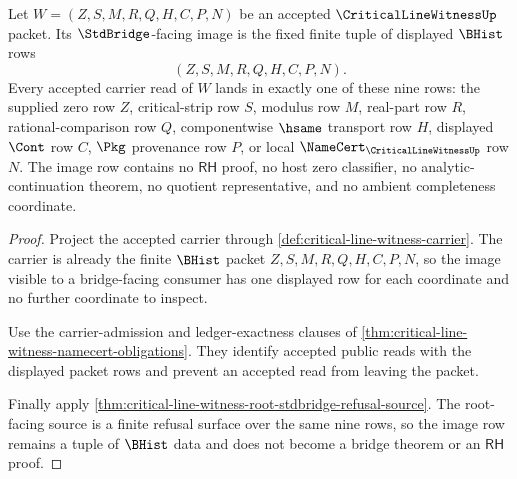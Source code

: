 \begin{theorem}
\label{thm:critical-line-witness-fixed-tuple-image-row}
Let $W=(Z,S,M,R,Q,H,C,P,N)$ be an accepted $\CriticalLineWitnessUp$ packet. Its $\StdBridge$-facing image is the fixed finite tuple of displayed $\BHist$ rows
$$
(Z,S,M,R,Q,H,C,P,N).
$$
Every accepted carrier read of $W$ lands in exactly one of these nine rows: the supplied zero row $Z$, critical-strip row $S$, modulus row $M$, real-part row $R$, rational-comparison row $Q$, componentwise $\hsame$ transport row $H$, displayed $\Cont$ row $C$, $\Pkg$ provenance row $P$, or local $\NameCert_{\CriticalLineWitnessUp}$ row $N$. The image row contains no $\mathsf{RH}$ proof, no host zero classifier, no analytic-continuation theorem, no quotient representative, and no ambient completeness coordinate.
\end{theorem}
\begin{proof}
Project the accepted carrier through \autoref{def:critical-line-witness-carrier}. The carrier is already the finite $\BHist$ packet $Z,S,M,R,Q,H,C,P,N$, so the image visible to a bridge-facing consumer has one displayed row for each coordinate and no further coordinate to inspect.

Use the carrier-admission and ledger-exactness clauses of \autoref{thm:critical-line-witness-namecert-obligations}. They identify accepted public reads with the displayed packet rows and prevent an accepted read from leaving the packet.

Finally apply \autoref{thm:critical-line-witness-root-stdbridge-refusal-source}. The root-facing source is a finite refusal surface over the same nine rows, so the image row remains a tuple of $\BHist$ data and does not become a bridge theorem or an $\mathsf{RH}$ proof.
\end{proof}

